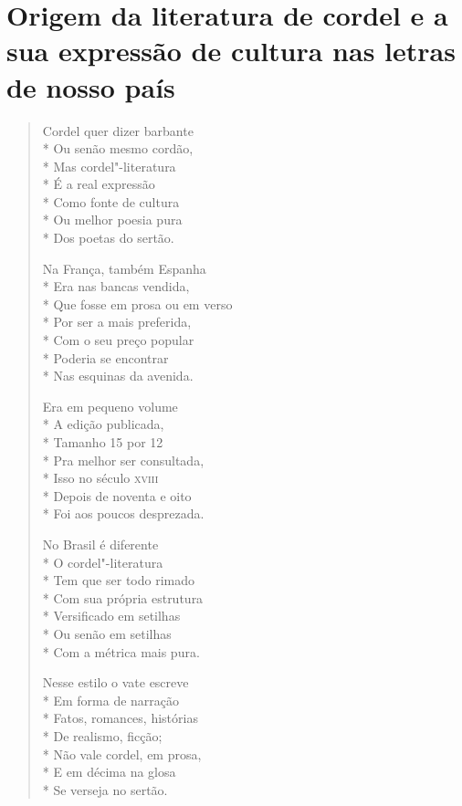 
\chapter[Origem da literatura de cordel e a sua expressão de cultura nas letras de nosso país]{Origem da literatura de cordel e a sua expressão de cultura nas letras de nosso país}

\begin{verse}
Cordel quer dizer barbante\\*
Ou senão mesmo cordão,\\*
Mas cordel"-literatura\\*
É a real expressão\\*
Como fonte de cultura\\*
Ou melhor poesia pura\\*
Dos poetas do sertão.

Na França, também Espanha\\*
Era nas bancas vendida,\\*
Que fosse em prosa ou em verso\\*
Por ser a mais preferida,\\*
Com o seu preço popular\\*
Poderia se encontrar\\*
Nas esquinas da avenida.

Era em pequeno volume\\*
A edição publicada,\\*
Tamanho 15 por 12\\*
Pra melhor ser consultada,\\*
Isso no século \textsc{xviii}\\*
Depois de noventa e oito\\*
Foi aos poucos desprezada.

No Brasil é diferente\\*
O cordel"-literatura\\*
Tem que ser todo rimado\\*
Com sua própria estrutura\\*
Versificado em setilhas\\*
Ou senão em setilhas\\*
Com a métrica mais pura.

Nesse estilo o vate escreve\\*
Em forma de narração\\*
Fatos, romances, histórias\\*
De realismo, ficção;\\*
Não vale cordel, em prosa,\\*
E em décima na glosa\\*
Se verseja no sertão.


\end{verse}
